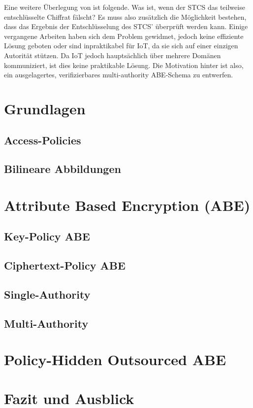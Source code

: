 \documentclass{hsflensburg}
\begin{document}
	Eine weitere Überlegung von \cite{phoabe} ist folgende. Was ist, wenn der STCS
	das teilweise entschlüsselte Chiffrat fälscht? Es muss also zusätzlich die
	Möglichkeit bestehen, dass das Ergebnis der Entschlüsselung des STCS'
	überprüft werden kann. Einige vergangene Arbeiten haben sich dem Problem
	gewidmet, jedoch keine effiziente Lösung geboten oder sind inpraktikabel für
	IoT, da sie sich auf einer einzigen Autorität stützen. Da IoT jedoch
	hauptsächlich über mehrere Domänen kommuniziert, ist dies keine praktikable
	Lösung. Die Motivation hinter \cite{phoabe} ist also, ein ausgelagertes,
	verifizierbares multi-authority ABE-Schema zu entwerfen.
	
	\section{Grundlagen}
	\subsection{Access-Policies}
	\subsection{Bilineare Abbildungen}

	\section{Attribute Based Encryption (ABE)}
	\subsection{Key-Policy ABE}
	\subsection{Ciphertext-Policy ABE}
	\subsection{Single-Authority}
	\subsection{Multi-Authority}

	\section{Policy-Hidden Outsourced ABE}
	\section{Fazit und Ausblick}

	
	
\end{document}
